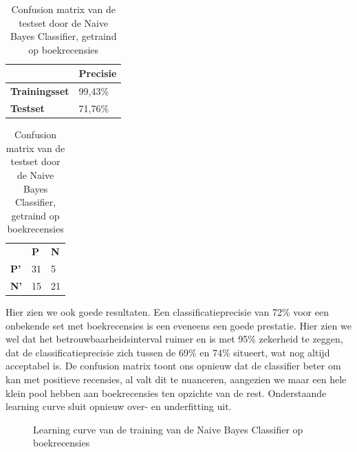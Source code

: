 \begin{table}[h]
\centering
\setlength\tabcolsep{4pt}
\begin{minipage}[t]{0.48\textwidth}
\centering
\begin{tabular}{l|l|}
\cline{2-2}
                                            & \textbf{Precisie} \\ \hline
\multicolumn{1}{|l|}{\textbf{Trainingsset}} & 99,43\%           \\ \hline
\multicolumn{1}{|l|}{\textbf{Testset}}      & 71,76\%           \\ \hline
\end{tabular}
\caption{Classificatieprecisie Naive Bayes Classifier, getraind op boekrecensies}
\end{minipage}%
\hfill
\begin{minipage}[t]{0.48\textwidth}
\centering
\begin{tabular}{lll}
                                 & \textbf{P}               & \textbf{N}            \\ \cline{2-3} 
\multicolumn{1}{l|}{\textbf{P'}} & \multicolumn{1}{l|}{31} & \multicolumn{1}{l|}{5} \\ \cline{2-3} 
\multicolumn{1}{l|}{\textbf{N'}} & \multicolumn{1}{l|}{15} & \multicolumn{1}{l|}{21} \\ \cline{2-3} 
\end{tabular}
\caption{Confusion matrix van de testset door de  Naive Bayes Classifier, getraind op boekrecensies} 
\end{minipage}
\end{table}


Hier zien we ook goede resultaten. Een classificatieprecisie van 72\% voor een onbekende set met boekrecensies is een eveneens een goede prestatie. Hier zien we wel dat het betrouwbaarheidsinterval ruimer en is met 95\% zekerheid te zeggen, dat de classificatieprecisie zich tussen de 69\% en 74\% situeert, wat nog altijd acceptabel is. De confusion matrix toont ons opnieuw dat de classifier beter om kan met positieve recensies, al valt dit te nuanceren, aangezien we maar een hele klein pool hebben aan boekrecensies ten opzichte van de rest. Onderstaande learning curve sluit opnieuw over- en underfitting uit.\\
\newpage
\begin{figure}%
    \centering
    \label{fig:lc-boek-boek}
    \caption{Learning curve van de training van de Naive Bayes Classifier op boekrecensies}
\end{figure}


